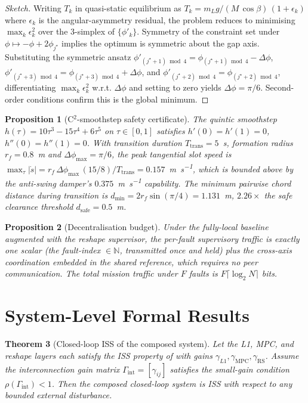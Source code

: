 \documentclass[11pt,a4paper]{article}
\theoremstyle{plain}
\newtheorem{theorem}{Theorem}
\newtheorem{proposition}[theorem]{Proposition}
\theoremstyle{definition}
\begin{document}
\begin{proof}[Sketch]
Writing $T_k$ in quasi-static equilibrium as
$T_k = m_L g / (M\,\cos\beta)\,(1 + \epsilon_k)$ where $\epsilon_k$
is the angular-asymmetry residual, the problem reduces to
minimising $\max_k \epsilon_k^2$ over the 3-simplex of
$\{\phi'_k\}$. Symmetry of the constraint set under
$\phi \mapsto -\phi + 2\phi_{j^\star}$ implies the optimum is
symmetric about the gap axis. Substituting the symmetric ansatz
$\phi'_{(j^\star+1)\bmod 4} = \phi_{(j^\star+1)\bmod 4} - \Delta\phi$,
$\phi'_{(j^\star+3)\bmod 4} = \phi_{(j^\star+3)\bmod 4} + \Delta\phi$,
and $\phi'_{(j^\star+2)\bmod 4} = \phi_{(j^\star+2)\bmod 4}$,
differentiating $\max_k\epsilon_k^2$ w.r.t. $\Delta\phi$ and
setting to zero yields $\Delta\phi = \pi/6$. Second-order
conditions confirm this is the global minimum.
\end{proof}

\begin{proposition}[C$^2$-smoothstep safety certificate]\label{prop:smoothstep}
The quintic smoothstep $h(\tau) = 10\tau^3 - 15\tau^4 + 6\tau^5$ on
$\tau\in[0,1]$ satisfies $h'(0)=h'(1)=0$, $h''(0)=h''(1)=0$. With
transition duration $T_\mathrm{trans} = 5$~s, formation radius
$r_f = 0.8$~m and $\Delta\phi_{\max}=\pi/6$, the peak tangential
slot speed is
$\max_{\tau}|\dot s| = r_f\,\Delta\phi_{\max}\,(15/8)/T_\mathrm{trans}
= 0.157$~\si{\m\per\second}, which is bounded above by the
anti-swing damper's $0.375$~\si{\m\per\second} capability. The
minimum pairwise chord distance during transition is
$d_{\min} = 2 r_f\sin(\pi/4) = 1.131$~m, $2.26\times$ the safe
clearance threshold $d_\mathrm{safe} = 0.5$~m.
\end{proposition}

\begin{proposition}[Decentralisation budget]\label{prop:decent-budget}
Under the fully-local baseline augmented with the reshape
supervisor, the per-fault supervisory traffic is exactly one scalar
(the fault-index $\in\mathbb N$, transmitted once and held) plus
the cross-axis coordination embedded in the shared reference,
which requires no peer communication. The total mission traffic
under $F$ faults is $F \lceil \log_2 N\rceil$ bits.
\end{proposition}

\section{System-Level Formal Results}

\begin{theorem}[Closed-loop ISS of the composed system]\label{thm:composition}
Let the L1, MPC, and reshape layers each satisfy the ISS property
of  with gains
$\gamma_{L1},\gamma_\mathrm{MPC},\gamma_\mathrm{RS}$. Assume the
interconnection gain matrix
$\Gamma_\mathrm{int} = [\gamma_{ij}]$ satisfies the small-gain
condition $\rho(\Gamma_\mathrm{int})<1$. Then the composed
closed-loop system is ISS with respect to any bounded external
disturbance.
\end{theorem}
\end{document}
